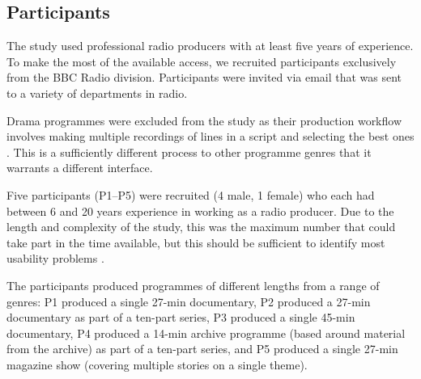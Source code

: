\subsection{Participants}
The study used professional radio producers with at least five years of
experience. To make the most of the available access, we recruited participants
exclusively from the BBC Radio division. Participants were invited via email
that was sent to a variety of departments in radio.

Drama programmes were excluded from the study as their production workflow
involves making multiple recordings of lines in a script and selecting the best
ones \cite{Baume2015}. This is a sufficiently different process to other
programme genres that it warrants a different interface.

Five participants (P1--P5) were recruited (4 male, 1 female) who each had
between 6 and 20 years experience in working as a radio producer. Due to the
length and complexity of the study, this was the maximum number that could take
part in the time available, but this should be sufficient to identify most
usability problems \cite{Nielsen1993}.

The participants produced programmes of different lengths from a range of
genres: P1 produced a single 27-min documentary, %
P2 produced a 27-min documentary as part of a ten-part series, P3 produced a
single 45-min documentary, P4 produced a 14-min archive programme (based around
material from the archive) as part of a ten-part series, and P5 produced a
single 27-min magazine show (covering multiple stories on a single theme).

